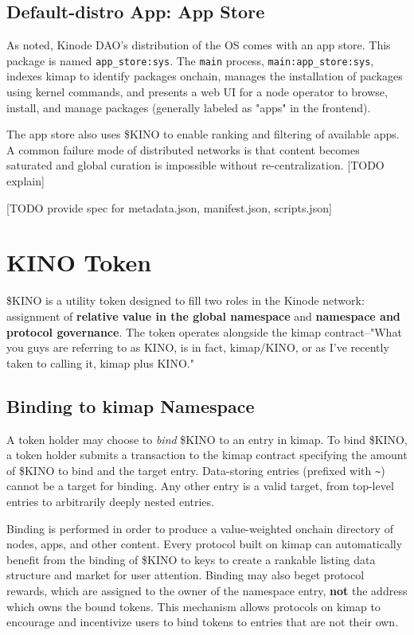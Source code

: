 \documentclass[runningheads]{llncs}
\begin{document}
\subsection{Default-distro App: App Store}

As noted, Kinode DAO's distribution of the OS comes with an app store.
This package is named \verb|app_store:sys|.
The \verb|main| process, \verb|main:app_store:sys|, indexes kimap to identify packages onchain, manages the installation of packages using kernel commands, and presents a web UI for a node operator to browse, install, and manage packages (generally labeled as "apps" in the frontend).

The app store also uses \$KINO to enable ranking and filtering of available apps.
A common failure mode of distributed networks is that content becomes saturated and global curation is impossible without re-centralization. [TODO explain]


[TODO provide spec for metadata.json, manifest.json, scripts.json]

%
%
%
\section{KINO Token}

\$KINO is a utility token designed to fill two roles in the Kinode network: assignment of \textbf{relative value in the global namespace} and \textbf{namespace and protocol governance}.
The token operates alongside the kimap contract–"What you guys are referring to as KINO, is in fact, kimap/KINO, or as I've recently taken to calling it, kimap plus KINO."

\subsection{Binding to kimap Namespace}

A token holder may choose to \textit{bind} \$KINO to an entry in kimap.
To bind \$KINO, a token holder submits a transaction to the kimap contract specifying the amount of \$KINO to bind and the target entry.
Data-storing entries (prefixed with \verb|~|) cannot be a target for binding.
Any other entry is a valid target, from top-level entries to arbitrarily deeply nested entries.

Binding is performed in order to produce a value-weighted onchain directory of nodes, apps, and other content.
Every protocol built on kimap can automatically benefit from the binding of \$KINO to keys to create a rankable listing data structure and market for user attention.
Binding may also beget protocol rewards, which are assigned to the owner of the namespace entry, \textbf{not} the address which owns the bound tokens.
This mechanism allows protocols on kimap to encourage and incentivize users to bind tokens to entries that are not their own.
\end{document}
